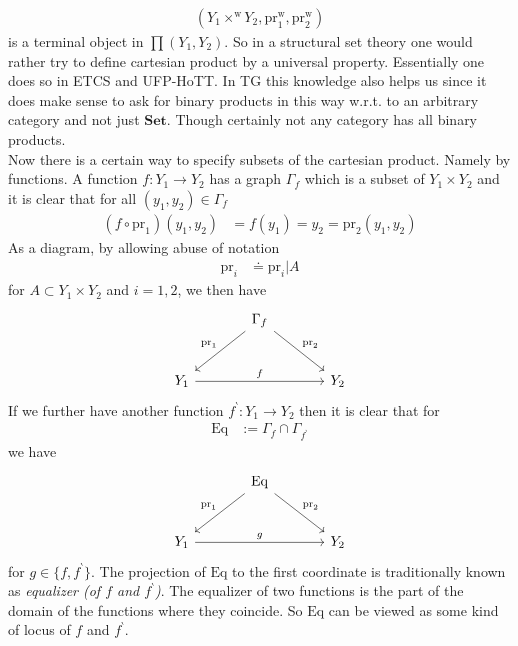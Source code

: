 \begin{align*}
  \left(
    Y_{1}
    \times^{\textrm{w}}
    Y_{2},
    \mathrm{pr}_{1}^{\textrm{w}},
    \mathrm{pr}_{2}^{\textrm{w}}
  \right)
\end{align*}
is a terminal object in $\pmb{\prod}(Y_{1},Y_{2})$. So in a structural set theory one would rather try to define cartesian product by a universal property. Essentially one does so in ETCS and UFP-HoTT. In TG this knowledge also helps us since it does make sense to ask for binary products in this way w.r.t. to an arbitrary category and not just $\mathbf{Set}$. Though certainly not any category has all binary products.
\\
Now there is a certain way to specify subsets of the cartesian product. Namely by functions. A function $f \colon Y_{1} \rightarrow Y_{2}$ has a graph $\Gamma_{f}$ which is a subset of $Y_{1} \times Y_{2}$ and it is clear that for all $(y_{1},y_{2}) \in \Gamma_{f}$
\begin{align*}
  \left(
    f
    \circ
    \mathrm{pr}_{1}
  \right)
  (y_{1},y_{2})
  &=
  f(y_{1})
  =
  y_{2}
  =
  \mathrm{pr}_{2}
  (y_{1},y_{2})
\end{align*}
As a diagram, by allowing abuse of notation
\begin{align*}
  \mathrm{pr}_{i}
  &\doteq
  \mathrm{pr}_{i} \vert A
\end{align*}
for $A \subset Y_{1} \times Y_{2}$ and $i=1,2$, we then have
\[
\begin{tikzcd}[sep=large]
  &
  \Gamma_{f}
  \arrow{dr}{\mathrm{pr}_{2}}
  \arrow[swap]{dl}{\mathrm{pr}_{1}}
  &
  \\
  Y_{1}
  \arrow{rr}{f}
  &
  &
  Y_{2}
\end{tikzcd}
\]
If we further have another function $f^{\backprime} \colon Y_{1} \rightarrow Y_{2}$ then it is clear that for
\begin{align*}
  \mathrm{Eq}
  &:=
  \Gamma_{f}
  \cap
  \Gamma_{f^{\backprime}}
\end{align*}
we have
\[
\begin{tikzcd}[sep=large]
  &
  \mathrm{Eq}
  \arrow{dr}{\mathrm{pr}_{2}}
  \arrow[swap]{dl}{\mathrm{pr}_{1}}
  &
  \\
  Y_{1}
  \arrow{rr}{g}
  &
  &
  Y_{2}
\end{tikzcd}
\]
for $g \in \lbrace f,f^{\backprime} \rbrace$. The projection of $\mathrm{Eq}$ to the first coordinate is traditionally known as \textit{equalizer (of $f$ and $f^{\backprime}$)}. The equalizer of two functions is the part of the domain of the functions where they coincide. So $\mathrm{Eq}$ can be viewed as some kind of locus of $f$ and $f^{\backprime}$.
